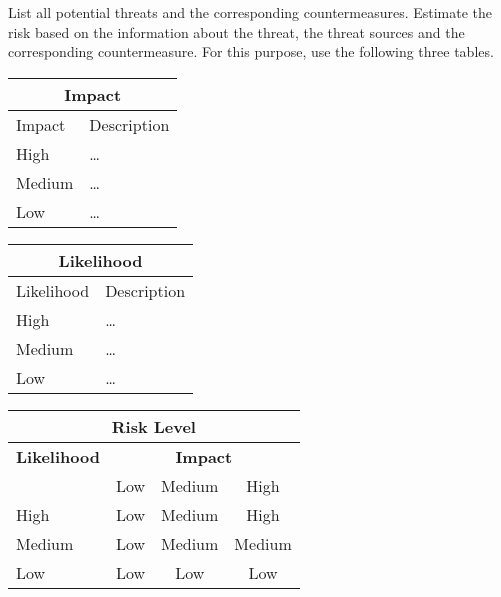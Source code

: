 \documentclass{article}
\begin{document}
List all potential threats and the
  corresponding countermeasures. Estimate the risk based on 
  the information about the threat, the threat sources and the 
  corresponding countermeasure. For this purpose, use the following three
  tables.


\begin{center}
\begin{tabular}{|l|l|}
\hline
\multicolumn{2}{|c|}{\bf Impact} \\
\hline
Impact & Description \\
\hline
\hline
High   & \hspace*{20pt}\ldots \\
\hline
Medium & \hspace*{20pt}\ldots \\
\hline
Low   & \hspace*{20pt}\ldots \\
\hline
\end{tabular}
%
%
\begin{tabular}{|l|l|}
\hline
\multicolumn{2}{|c|}{\bf Likelihood} \\
\hline
Likelihood & Description \\
\hline
\hline
High   & \hspace*{20pt}\ldots \\
\hline
Medium & \hspace*{20pt}\ldots \\
\hline
Low   & \hspace*{20pt}\ldots \\
\hline
\end{tabular}
\end{center}

\vspace{5mm}

\begin{center}
\begin{tabular}{|l|c|c|c|}
\hline
\multicolumn{4}{|c|}{{\bf Risk Level}} \\
\hline
{{\bf Likelihood}} & \multicolumn{3}{c|}{{\bf Impact}} \\ %
     & Low & Medium & High \\  \hline
 High & Low & Medium & High  \\
\hline
 Medium & Low & Medium & Medium \\
\hline
 Low & Low & Low & Low \\
\hline
\end{tabular}
\end{center}
\end{document}
